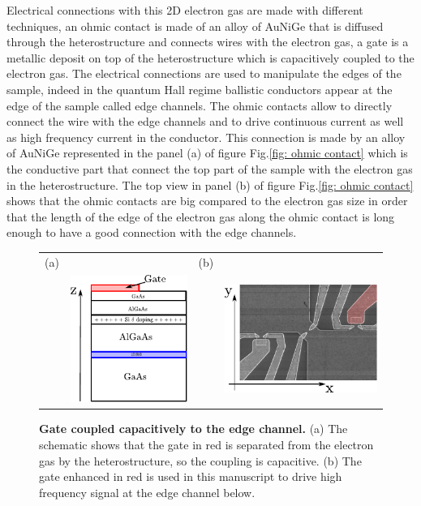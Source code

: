 Electrical connections with this 2D electron gas are made with different techniques, an ohmic contact is made of an alloy of AuNiGe that is diffused through the heterostructure and connects wires with the electron gas, a gate is a metallic deposit on top of the heterostructure which is capacitively coupled to the electron gas.
The electrical connections are used to manipulate the edges of the sample, indeed in the quantum Hall regime ballistic conductors appear at the edge of the sample called edge channels.
The ohmic contacts allow to directly connect the wire with the edge channels and to drive continuous current as well as high frequency current in the conductor.
This connection is made by an alloy of AuNiGe represented in the panel (a) of figure Fig.\ref{fig: ohmic contact} which is the conductive part that connect the top part of the sample with the electron gas in the heterostructure.
The top view in panel (b) of figure Fig.\ref{fig: ohmic contact} shows that the ohmic contacts are big compared to the electron gas size in order that the length of the edge of the electron gas along the ohmic contact is long enough to have a good connection with the edge channels. 

\begin{figure}[hptb]
	\begin{center}
		\begin{tabular}{c c c c}
			(a) & & (b) & \\
			& \includegraphics[width = 4 cm]{./intro/gate_cut_view}
			& &
			\includegraphics[width = 4 cm]{./intro/gate_top_view} \\
		\end{tabular}
	\end{center}
	
	\caption{\textbf{Gate coupled capacitively to the edge channel.} (a) The schematic shows that the gate in red is separated from the electron gas by the heterostructure, so the coupling is capacitive. (b) The gate enhanced in red is used in this manuscript to drive high frequency signal at the edge channel below.}
	\label{fig: gate}
\end{figure}

